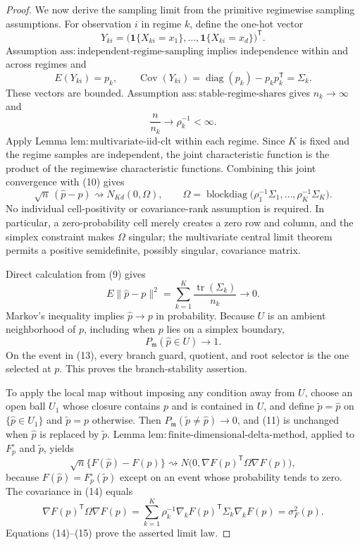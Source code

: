 \documentclass{article}
\begin{document}
\begin{proof}
We now derive the sampling limit from the primitive regimewise sampling assumptions.  For observation \(i\) in regime \(k\), define the one-hot vector
\[
 Y_{ki}=\bigl(\mathbf 1\{X_{ki}=x_1\},\ldots,
                    \mathbf 1\{X_{ki}=x_d\}\bigr)^{\mathsf T}.
\]
Assumption \(\mathrm{ass:independent\text{-}regime\text{-}sampling}\) implies independence within and across regimes and
\[
 E(Y_{ki})=p_k,
 \qquad
 \operatorname{Cov}(Y_{ki})
 =\operatorname{diag}(p_k)-p_kp_k^{\mathsf T}
 =\Sigma_k. \tag{9}
\]
These vectors are bounded.  Assumption \(\mathrm{ass:stable\text{-}regime\text{-}shares}\) gives \(n_k\to\infty\) and
\[
 \frac{n}{n_k}\longrightarrow\rho_k^{-1}<\infty. \tag{10}
\]
Apply Lemma \(\mathrm{lem:multivariate\text{-}iid\text{-}clt}\) within each regime.  Since \(K\) is fixed and the regime samples are independent, the joint characteristic function is the product of the regimewise characteristic functions.  Combining this joint convergence with (10) gives
\[
 \sqrt n\,(\widehat p-p)
 \rightsquigarrow
 N_{Kd}(0,\Omega),
 \qquad
 \Omega=\operatorname{blockdiag}
 \bigl(\rho_1^{-1}\Sigma_1,\ldots,
       \rho_K^{-1}\Sigma_K\bigr). \tag{11}
\]
No individual cell-positivity or covariance-rank assumption is required.  In particular, a zero-probability cell merely creates a zero row and column, and the simplex constraint makes \(\Omega\) singular; the multivariate central limit theorem permits a positive semidefinite, possibly singular, covariance matrix.

Direct calculation from (9) gives
\[
 E\lVert\widehat p-p\rVert^2
 =\sum_{k=1}^{K}\frac{\operatorname{tr}(\Sigma_k)}{n_k}
 \longrightarrow0. \tag{12}
\]
Markov's inequality implies \(\widehat p\to p\) in probability.  Because \(U\) is an ambient neighborhood of \(p\), including when \(p\) lies on a simplex boundary,
\[
 P_{\mathfrak m}(\widehat p\in U)\longrightarrow1. \tag{13}
\]
On the event in (13), every branch guard, quotient, and root selector is the one selected at \(p\).  This proves the branch-stability assertion.

To apply the local map without imposing any condition away from \(U\), choose an open ball \(U_1\) whose closure contains \(p\) and is contained in \(U\), and define \(\widetilde p=\widehat p\) on \(\{\widehat p\in U_1\}\) and \(\widetilde p=p\) otherwise.  Then \(P_{\mathfrak m}(\widetilde p\ne\widehat p)\to0\), and (11) is unchanged when \(\widehat p\) is replaced by \(\widetilde p\).  Lemma \(\mathrm{lem:finite\text{-}dimensional\text{-}delta\text{-}method}\), applied to \(F_p^{\circ}\) and \(\widetilde p\), yields
\[
 \sqrt n\{F(\widehat p)-F(p)\}
 \rightsquigarrow N\bigl(0,\nabla F(p)^{\mathsf T}\Omega\nabla F(p)\bigr), \tag{14}
\]
because \(F(\widehat p)=F_p^{\circ}(\widetilde p)\) except on an event whose probability tends to zero.  The covariance in (14) equals
\[
 \nabla F(p)^{\mathsf T}\Omega\nabla F(p)
 =\sum_{k=1}^{K}\rho_k^{-1}
   \nabla_kF(p)^{\mathsf T}\Sigma_k\nabla_kF(p)
 =\sigma_F^2(p). \tag{15}
\]
Equations (14)--(15) prove the asserted limit law.


\end{proof}
\end{document}
